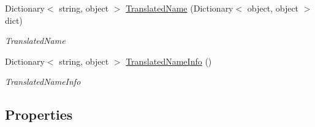 \begin{DoxyCompactItemize}
Dictionary$<$ string, object $>$ \hyperlink{classrosette__api_1_1_c_a_p_i_a705a8033ee7c8da35e1544de53137084}{Translated\+Name} (Dictionary$<$ object, object $>$ dict)
\begin{DoxyCompactList}\small\item\em Translated\+Name \end{DoxyCompactList}\item 
Dictionary$<$ string, object $>$ \hyperlink{classrosette__api_1_1_c_a_p_i_af5e226e8bbf466846ffb4e9786821fcd}{Translated\+Name\+Info} ()
\begin{DoxyCompactList}\small\item\em Translated\+Name\+Info \end{DoxyCompactList}\end{DoxyCompactItemize}
\subsection*{Properties}
